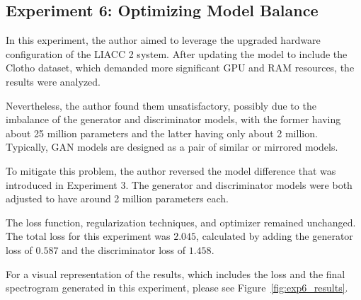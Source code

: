 \subsection{Experiment 6: Optimizing Model Balance} \label{sec:exp6}

In this experiment, the author aimed to leverage the upgraded hardware configuration of the \ac{LIACC} 2 system. After updating the model to include the Clotho dataset, which demanded more significant \ac{GPU} and \ac{RAM} resources, the results were analyzed.

Nevertheless, the author found them unsatisfactory, possibly due to the imbalance of the generator and discriminator models, with the former having about 25 million parameters and the latter having only about 2 million. Typically, \ac{GAN} models are designed as a pair of similar or mirrored models.

To mitigate this problem, the author reversed the model difference that was introduced in Experiment 3. The generator and discriminator models were both adjusted to have around 2 million parameters each.

The loss function, regularization techniques, and optimizer remained unchanged. The total loss for this experiment was $2.045$, calculated by adding the generator loss of $0.587$ and the discriminator loss of $1.458$.

For a visual representation of the results, which includes the loss and the final spectrogram generated in this experiment, please see Figure~\ref{fig:exp6_results}.

